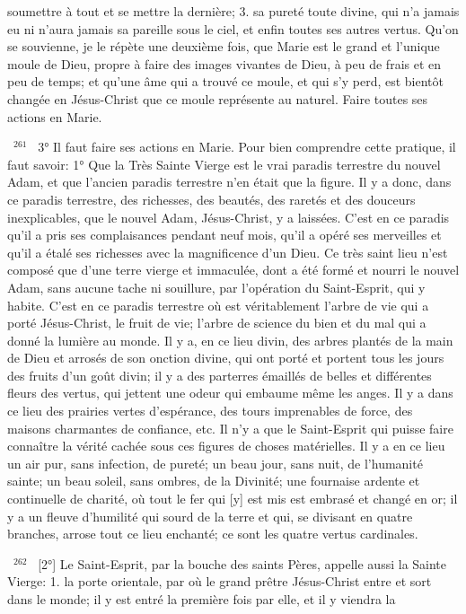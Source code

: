 \documentclass[paper=a5,pagesize=pdftex,fontsize=15pt,headinclude=on,twoside=off]{scrbook}
\newcommand{\negphantom}[1]{\settowidth{\dimen0}{#1}\hspace*{-\dimen0}}
\newcommand{\versenb}[1]{\par \vspace{10pt}~\negphantom{~${}^{#1}$~}${}^{#1}$~}
\begin{document}
soumettre à tout et se mettre la dernière; 3. sa pureté toute divine, qui n'a jamais eu ni n'aura jamais sa pareille
sous le ciel, et enfin toutes ses autres vertus.
Qu'on se souvienne, je le répète une deuxième fois, que Marie est le grand et l'unique moule de Dieu, propre à
faire des images vivantes de Dieu, à peu de frais et en peu de temps; et qu'une âme qui a trouvé ce moule, et qui
s'y perd, est bientôt changée en Jésus-Christ que ce moule représente au naturel.
Faire toutes ses actions en Marie.
\versenb{261} 3° Il faut faire ses actions en Marie. Pour bien comprendre cette pratique, il faut savoir: 1° Que la Très Sainte
Vierge est le vrai paradis terrestre du nouvel Adam, et que l'ancien paradis terrestre n'en était que la figure. Il y a
donc, dans ce paradis terrestre, des richesses, des beautés, des raretés et des douceurs inexplicables, que le
nouvel Adam, Jésus-Christ, y a laissées. C'est en ce paradis qu'il a pris ses complaisances pendant neuf mois,
qu'il a opéré ses merveilles et qu'il a étalé ses richesses avec la magnificence d'un Dieu. Ce très saint lieu n'est
composé que d'une terre vierge et immaculée, dont a été formé et nourri le nouvel Adam, sans aucune tache ni
souillure, par l'opération du Saint-Esprit, qui y habite. C'est en ce paradis terrestre où est véritablement l'arbre de
vie qui a porté Jésus-Christ, le fruit de vie; l'arbre de science du bien et du mal qui a donné la lumière au monde. Il
y a, en ce lieu divin, des arbres plantés de la main de Dieu et arrosés de son onction divine, qui ont porté et
portent tous les jours des fruits d'un goût divin; il y a des parterres émaillés de belles et différentes fleurs des
vertus, qui jettent une odeur qui embaume même les anges. Il y a dans ce lieu des prairies vertes d'espérance,
des tours imprenables de force, des maisons charmantes de confiance, etc. Il n'y a que le Saint-Esprit qui puisse
faire connaître la vérité cachée sous ces figures de choses matérielles. Il y a en ce lieu un air pur, sans infection,
de pureté; un beau jour, sans nuit, de l'humanité sainte; un beau soleil, sans ombres, de la Divinité; une fournaise
ardente et continuelle de charité, où tout le fer qui [y] est mis est embrasé et changé en or; il y a un fleuve
d'humilité qui sourd de la terre et qui, se divisant en quatre branches, arrose tout ce lieu enchanté; ce sont les
quatre vertus cardinales.
\versenb{262} [2°] Le Saint-Esprit, par la bouche des saints Pères, appelle aussi la Sainte Vierge: 1. la porte orientale, par
où le grand prêtre Jésus-Christ entre et sort dans le monde; il y est entré la première fois par elle, et il y viendra la
\end{document}
